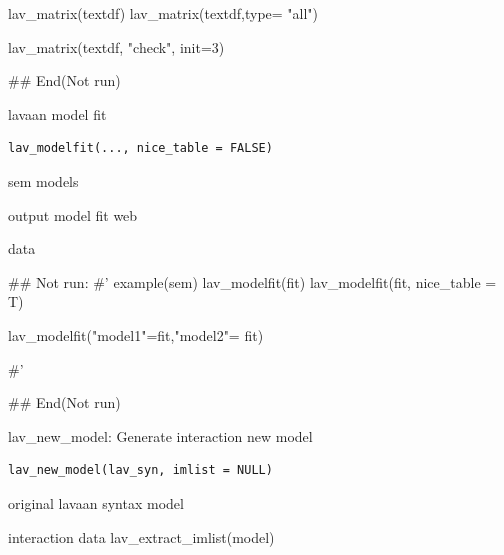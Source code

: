 \documentclass[a4paper]{book}
\begin{document}
\begin{Examples}
\begin{ExampleCode}
lav_matrix(textdf)
lav_matrix(textdf,type= "all")

lav_matrix(textdf, "check", init=3)



## End(Not run)

\end{ExampleCode}
\end{Examples}
%
\begin{Description}
lavaan model fit
\end{Description}
%
\begin{Usage}
\begin{verbatim}
lav_modelfit(..., nice_table = FALSE)
\end{verbatim}
\end{Usage}
%
\begin{Arguments}
\begin{ldescription}
\item[\code{...}] sem models

\item[\code{nice\_table}] output model fit web
\end{ldescription}
\end{Arguments}
%
\begin{Value}
data
\end{Value}
%
\begin{Examples}
\begin{ExampleCode}

\#\# Not run: 
#'
example(sem)
lav_modelfit(fit)
lav_modelfit(fit, nice_table = T)

lav_modelfit("model1"=fit,"model2"= fit)

#'

## End(Not run)


\end{ExampleCode}
\end{Examples}
%
\begin{Description}
lav\_new\_model: Generate interaction new model
\end{Description}
%
\begin{Usage}
\begin{verbatim}
lav_new_model(lav_syn, imlist = NULL)
\end{verbatim}
\end{Usage}
%
\begin{Arguments}
\begin{ldescription}
\item[\code{lav\_syn}] original lavaan syntax model

\item[\code{imlist}] interaction data lav\_extract\_imlist(model)
\end{ldescription}
\end{Arguments}
\end{document}
